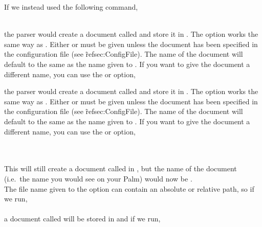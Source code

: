If we instead used the following command,\\

\\

\begin{latexonly}
the parser would create a document called  and store
it in . The  option works the same
way as . Either  or  must be given unless
the document has been specified in the configuration file (see
\~ref{sec:ConfigFile}).  The name of the document will default to the same
as the name given to . If you want to give the document a
different name, you can use the  or
 option,
\end{latexonly}
\begin{htmlonly}
the parser would create a document called  and store
it in . The  option works the same
way as . Either  or  must be given unless
the document has been specified in the configuration file (see
\~ref{sec:ConfigFile}). The name of the document will default to the same
as the name given to . If you want to give the document a
different name, you can use the  or
 option,
\end{htmlonly}\\

\\

This will still create a document called  in
, but the name of the document (i.e.\ the name you
would see on your Palm) would now be .\\

The file name given to the  option can contain an absolute
or relative path, so if we run,\\

\\

a document called  will be stored in
 and if we run,\\

\\

